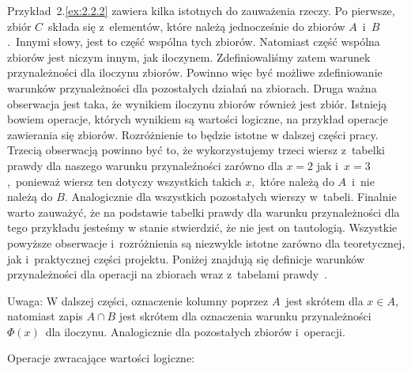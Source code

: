 \documentclass{SGGW-thesis}
\begin{document}
\begin{paragraph}{}
    Przykład~2.\ref{ex:2.2.2} zawiera kilka istotnych do zauważenia rzeczy. Po pierwsze, zbiór $C$~składa się z~elementów, które należą jednocześnie do zbiorów $A$~i~$B$.~Innymi słowy, jest to część wspólna tych zbiorów. Natomiast część wspólna zbiorów jest niczym innym, jak iloczynem. Zdefiniowaliśmy zatem warunek przynależności dla iloczynu zbiorów. Powinno więc być możliwe zdefiniowanie warunków przynależności dla pozostałych działań na zbiorach.
    Druga ważna obserwacja jest taka, że wynikiem iloczynu zbiorów również jest zbiór. Istnieją bowiem operacje, których wynikiem są wartości logiczne, na przykład operacje zawierania się zbiorów. Rozróżnienie to będzie istotne w dalszej części pracy.
    Trzecią obserwacją powinno być to, że wykorzystujemy trzeci wiersz z~tabelki prawdy dla naszego warunku przynaleźności zarówno dla $x=2$ jak i~$x=3$,~ponieważ wiersz ten dotyczy wszystkich takich $x$,~które należą do $A$~i~nie należą do $B$. Analogicznie dla wszystkich pozostałych wierszy w~tabeli. Finalnie warto zauważyć, że na podstawie tabelki prawdy dla warunku przynależności dla tego przykładu jesteśmy w stanie stwierdzić, że nie jest on tautologią.
    Wszystkie powyższe obserwacje i~rozróżnienia są niezwykle istotne zarówno dla teoretycznej, jak i~praktycznej części projektu. Poniżej znajdują się definicje warunków przynależności dla operacji na zbiorach wraz z~tabelami prawdy~\cite{ross2003discrete}. 
\end{paragraph}
 \begin{paragraph}{Uwaga:}
 W dalszej części, oznaczenie kolumny poprzez $A$~jest skrótem dla $x \in A$, natomiast zapis $A \cap B$ jest skrótem dla oznaczenia warunku przynależności $\Phi(x)$~dla iloczynu. Analogicznie dla pozostałych zbiorów i~operacji.
\end{paragraph}

\begin{paragraph}{}
    Operacje zwracające wartości logiczne:
\end{paragraph}
\end{document}
